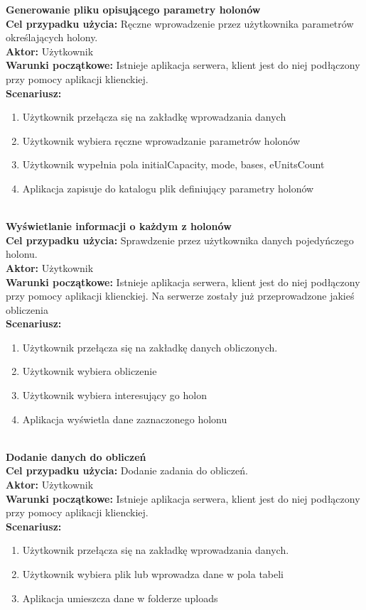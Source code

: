 		\textbf{Generowanie pliku opisującego parametry holonów}\\
	\textbf{Cel przypadku użycia:} Ręczne wprowadzenie przez użytkownika parametrów określających holony.\\
	\textbf{Aktor:} Użytkownik\\
	\textbf{Warunki początkowe:} Istnieje aplikacja serwera, klient jest do niej podłączony przy pomocy aplikacji klienckiej.\\
	\textbf{Scenariusz:}
	\begin{enumerate}
	\item Użytkownik przełącza się na zakładkę wprowadzania danych
	\item Użytkownik wybiera ręczne wprowadzanie parametrów holonów
	\item Użytkownik wypełnia pola initialCapacity, mode, bases, eUnitsCount
	\item Aplikacja zapisuje do katalogu plik definiujący parametry holonów\\\\
	\end{enumerate}
	
	\textbf{Wyświetlanie informacji o każdym z holonów}\\
	\textbf{Cel przypadku użycia:} Sprawdzenie przez użytkownika danych pojedyńczego holonu.\\
	\textbf{Aktor:} Użytkownik\\
	\textbf{Warunki początkowe:} Istnieje aplikacja serwera, klient jest do niej podłączony przy pomocy aplikacji klienckiej. Na serwerze zostały już przeprowadzone jakieś obliczenia\\
	\textbf{Scenariusz:}
	\begin{enumerate}
	\item Użytkownik przełącza się na zakładkę danych obliczonych.
	\item Użytkownik wybiera obliczenie
	\item Użytkownik wybiera interesujący go holon
	\item Aplikacja wyświetla dane zaznaczonego holonu\\\\
	\end{enumerate}
	
	\textbf{Dodanie danych do obliczeń}\\
	\textbf{Cel przypadku użycia:} Dodanie zadania do obliczeń.\\
	\textbf{Aktor:} Użytkownik\\
	\textbf{Warunki początkowe:} Istnieje aplikacja serwera, klient jest do niej podłączony przy pomocy aplikacji klienckiej.\\
	\textbf{Scenariusz:}
	\begin{enumerate}
	\item Użytkownik przełącza się na zakładkę wprowadzania danych.
	\item Użytkownik wybiera plik lub wprowadza dane w pola tabeli
	\item Aplikacja umieszcza dane w folderze uploads\\
	\end{enumerate}


